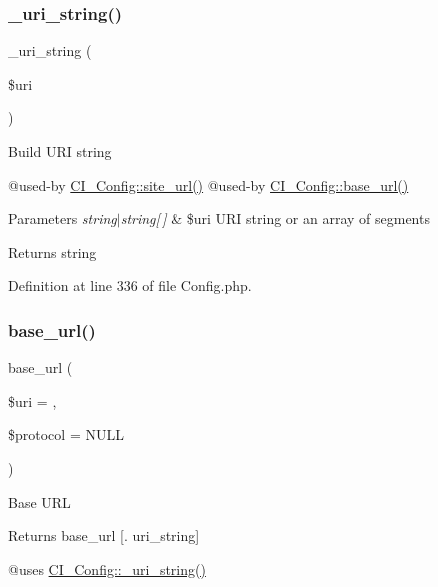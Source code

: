 \subsubsection{\texorpdfstring{\_uri\_string()}{\_uri\_string()}}
{\footnotesize\ttfamily \+\_\+uri\+\_\+string (\begin{DoxyParamCaption}\item[{}]{\$uri }\end{DoxyParamCaption})\hspace{0.3cm}{\ttfamily [protected]}}

Build U\+RI string

@used-\/by \mbox{\hyperlink{class_c_i___config_a3a12687251c502cb2d9c1e3f77ca56b8}{C\+I\+\_\+\+Config\+::site\+\_\+url()}} @used-\/by \mbox{\hyperlink{class_c_i___config_a209120be5e55785e74609097123b40cf}{C\+I\+\_\+\+Config\+::base\+\_\+url()}}


\begin{DoxyParams}{Parameters}
{\em string$\vert$string\mbox{[}$\,$\mbox{]}} & \$uri U\+RI string or an array of segments \\
\hline
\end{DoxyParams}
\begin{DoxyReturn}{Returns}
string 
\end{DoxyReturn}


Definition at line 336 of file Config.\+php.

\mbox{\label{class_c_i___config_a209120be5e55785e74609097123b40cf}} 
\subsubsection{\texorpdfstring{base\_url()}{base\_url()}}
{\footnotesize\ttfamily base\+\_\+url (\begin{DoxyParamCaption}\item[{}]{\$uri = {\ttfamily \textquotesingle{}\textquotesingle{}},  }\item[{}]{\$protocol = {\ttfamily NULL} }\end{DoxyParamCaption})}

Base U\+RL

Returns base\+\_\+url \mbox{[}. uri\+\_\+string\mbox{]}

@uses \mbox{\hyperlink{class_c_i___config_a8a0a35d53f0904d9f655e82804b9998d}{C\+I\+\_\+\+Config\+::\+\_\+uri\+\_\+string()}}


